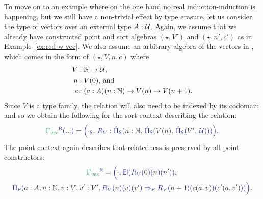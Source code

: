 \begin{example}[Vectors]
To move on to an example where on the one hand no real induction-induction is
happening, but we still have a non-trivial effect by type erasure, let us
consider the type of vectors over an external type $A : \mathcal{U}$.
Again, we assume that we already have constructed point and sort algebras
$(\star, V')$ and $(\star, n', c')$ as in Example~\ref{ex:red-w-vec}.
We also assume an arbitrary algebra of the vectors in , which
comes in the form of $(\star, V, n, c)$ where
\begin{align*}
V &: \mathbb{N} \to \mathcal{U} \text{,} \\
n &: V(0) \text{, and} \\
c &: (a : A)(n : \mathbb{N}) \to V(n) \to V(n + 1) \text{.}
\end{align*}
Since $V$ is a type family, the relation will also need to be indexed by its codomain
and so we obtain the following for the sort context describing the relation:
\begin{equation*}
\tqm{\grm{\Gamma_{vec}}^\RR(...)} =
  \tqm{\Bigl( \cdot_\Sc ,\, R_V : \ExtPiS{n : \N}{\ExtPiS{V(n)}{\ExtPiS{V'}{\UU}}} \Bigr)} \text{.}
\end{equation*}
The point context again describes that relatedness is preserved by all point
constructors:
\begin{equation*}
\begin{gathered}
\tqm{\grm{\Gamma_{vec}}^\RR}
  = \tqm{ \Bigl( \cdot ,\,} \tqm{ \El(R_V(\blm{0})(\blm{n})(\blm{n'})) ,\, } \\
\tqm{\hat{\Pi}_\Pc(\blm{a : A}, \blm{n : \N}, \blm{v : V}, \blm{v' : V'}, 
   R_V(\blm{n})(\blm{v})(\blm{v'}) 
     \Rightarrow_\Pc R_V(\blm{n+1})(\blm{c(a,v)})(\blm{c'(a,v')}) ) \Bigr) } \text{.}
\end{gathered}
\end{equation*}
\end{example}


